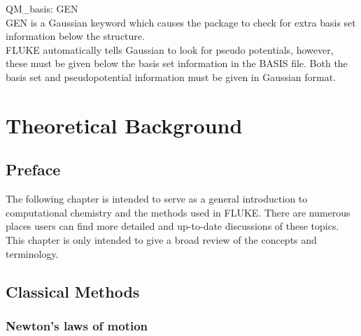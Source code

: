 \documentclass[12pt]{report}
\begin{document}
QM\_basis: GEN \\

GEN is a Gaussian keyword which causes the package to check for extra basis
set information below the structure. \\

FLUKE automatically tells Gaussian to look for pseudo potentials, however,
these must be given below the basis set information in the BASIS file. Both
the basis set and pseudopotential information must be given in Gaussian
format.

\chapter{Theoretical Background}
\label{chap:Theory}

\section{Preface}

The following chapter is intended to serve as a general introduction to
computational chemistry and the methods used in FLUKE. There are numerous
places users can find more detailed and up-to-date discussions of these
topics. This chapter is only intended to give a broad review of the concepts
and terminology.

\section{Classical Methods}

\subsection{Newton's laws of motion}
\end{document}
